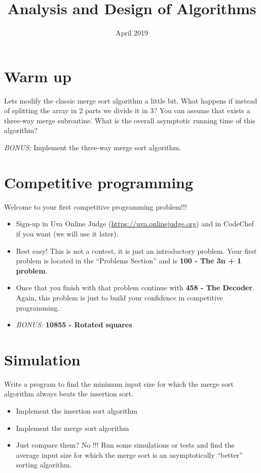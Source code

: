 \documentclass[12pt]{article}
\title{Analysis and Design of Algorithms}
\author{}
\date{April 2019}
\begin{document}
\maketitle

\section{Warm up}

Lets modify the classic merge sort algorithm a little bit. What happens if instead of splitting the array in 2 parts we divide it in 3? You can assume that exists a three-way merge subroutine. What is the overall asymptotic running time of this algorithm?

\emph{BONUS:} Implement the three-way merge sort algorithm.

\section{Competitive programming}

Welcome to your first competitive programming problem!!! 

\begin{itemize}
    \item Sign-up in Uva Online Judge (\url{https://uva.onlinejudge.org}) and in CodeChef if you want (we will use it later).
    \item Rest easy! This is not a contest, it is just an introductory problem. Your first problem is located in the ``Problems Section'' and is \textbf{100 - The 3n + 1 problem}.
    
    \item Once that you finish with that problem continue with \textbf{458 - The Decoder}. Again, this problem is just to build your confidence in competitive programming.
    
    \item \emph{BONUS:} \textbf{10855 - Rotated squares}
    
\end{itemize}

\section{Simulation}

Write a program to find the minimum input size for which the merge sort algorithm always beats the insertion sort.

\begin{itemize}
    \item Implement the insertion sort algorithm
    \item Implement the merge sort algorithm
    \item Just compare them? No !!! Run some simulations or tests and find the average input size for which the merge sort is an asymptotically ``better'' sorting algorithm.
\end{itemize}
\end{document}
